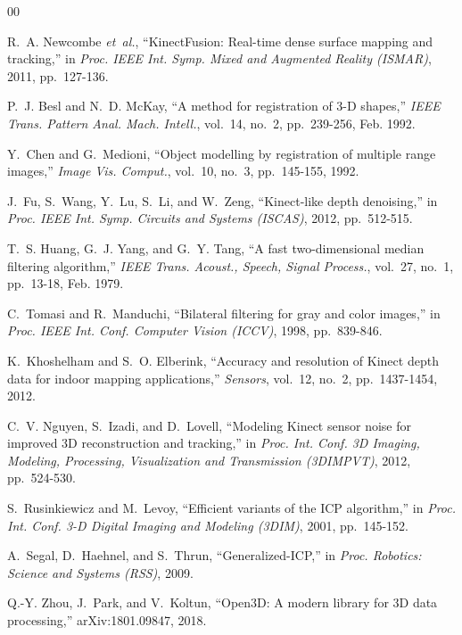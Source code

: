 \documentclass[conference]{IEEEtran}
\begin{document}
\begin{thebibliography}{00}

R.~A. Newcombe \emph{et~al.}, ``KinectFusion: Real-time dense surface mapping
and tracking,'' in \emph{Proc. IEEE Int. Symp. Mixed and Augmented Reality
(ISMAR)}, 2011, pp.~127-136.

P.~J. Besl and N.~D. McKay, ``A method for registration of 3-D shapes,''
\emph{IEEE Trans. Pattern Anal. Mach. Intell.}, vol.~14, no.~2, pp.~239-256,
Feb. 1992.

Y.~Chen and G.~Medioni, ``Object modelling by registration of multiple range
images,'' \emph{Image Vis. Comput.}, vol.~10, no.~3, pp.~145-155, 1992.

J.~Fu, S.~Wang, Y.~Lu, S.~Li, and W.~Zeng, ``Kinect-like depth denoising,'' in
\emph{Proc. IEEE Int. Symp. Circuits and Systems (ISCAS)}, 2012,
pp.~512-515.

T.~S. Huang, G.~J. Yang, and G.~Y. Tang, ``A fast two-dimensional median
filtering algorithm,'' \emph{IEEE Trans. Acoust., Speech, Signal Process.},
vol.~27, no.~1, pp.~13-18, Feb. 1979.

C.~Tomasi and R.~Manduchi, ``Bilateral filtering for gray and color images,''
in \emph{Proc. IEEE Int. Conf. Computer Vision (ICCV)}, 1998, pp.~839-846.

K.~Khoshelham and S.~O. Elberink, ``Accuracy and resolution of Kinect depth
data for indoor mapping applications,'' \emph{Sensors}, vol.~12, no.~2,
pp.~1437-1454, 2012.

C.~V. Nguyen, S.~Izadi, and D.~Lovell, ``Modeling Kinect sensor noise for
improved 3D reconstruction and tracking,'' in \emph{Proc. Int. Conf. 3D
Imaging, Modeling, Processing, Visualization and Transmission (3DIMPVT)},
2012, pp.~524-530.

S.~Rusinkiewicz and M.~Levoy, ``Efficient variants of the ICP algorithm,'' in
\emph{Proc. Int. Conf. 3-D Digital Imaging and Modeling (3DIM)}, 2001,
pp.~145-152.

A.~Segal, D.~Haehnel, and S.~Thrun, ``Generalized-ICP,'' in \emph{Proc.
Robotics: Science and Systems (RSS)}, 2009.

Q.-Y. Zhou, J.~Park, and V.~Koltun, ``Open3D: A modern library for 3D data
processing,'' arXiv:1801.09847, 2018.


\end{thebibliography}
\end{document}
